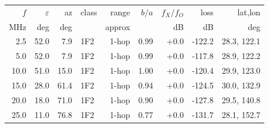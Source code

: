 \begin{tabular}{rrrlrrrrr}
\toprule
$f$ & $\varepsilon$ & az & class & range & $b/a$ & $f_X/f_O$ & loss & lat,lon \\
MHz & deg & deg & & approx & & dB & dB & deg \\
\midrule
2.5 & 52.0 & 7.9 & 1F2 & 1-hop & 0.99 & +0.0 & -122.2 & 28.3, 122.1 \\
5.0 & 52.0 & 7.9 & 1F2 & 1-hop & 0.99 & +0.0 & -117.8 & 28.9, 122.2 \\
10.0 & 51.0 & 15.0 & 1F2 & 1-hop & 1.00 & +0.0 & -120.4 & 29.9, 123.0 \\
15.0 & 28.0 & 61.4 & 1F2 & 1-hop & 0.94 & +0.0 & -124.5 & 30.0, 132.9 \\
20.0 & 18.0 & 71.0 & 1F2 & 1-hop & 0.90 & +0.0 & -127.8 & 29.5, 140.8 \\
25.0 & 11.0 & 76.8 & 1F2 & 1-hop & 0.77 & +0.0 & -131.7 & 28.1, 152.7 \\
\bottomrule
\end{tabular}
